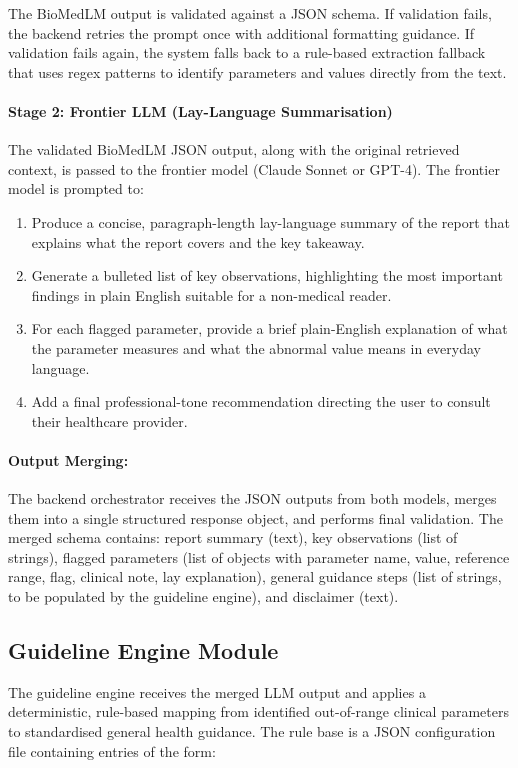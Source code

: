 \documentclass[12pt,a4paper]{report}
\begin{document}
The BioMedLM output is validated against a JSON schema. If validation fails, the backend retries the prompt once with additional formatting guidance. If validation fails again, the system falls back to a rule-based extraction fallback that uses regex patterns to identify parameters and values directly from the text.

\paragraph{Stage 2: Frontier LLM (Lay-Language Summarisation)}
The validated BioMedLM JSON output, along with the original retrieved context, is passed to the frontier model (Claude Sonnet or GPT-4). The frontier model is prompted to:

\begin{enumerate}
    \item Produce a concise, paragraph-length lay-language summary of the report that explains what the report covers and the key takeaway.
    \item Generate a bulleted list of key observations, highlighting the most important findings in plain English suitable for a non-medical reader.
    \item For each flagged parameter, provide a brief plain-English explanation of what the parameter measures and what the abnormal value means in everyday language.
    \item Add a final professional-tone recommendation directing the user to consult their healthcare provider.
\end{enumerate}

\paragraph{Output Merging:}
The backend orchestrator receives the JSON outputs from both models, merges them into a single structured response object, and performs final validation. The merged schema contains: report summary (text), key observations (list of strings), flagged parameters (list of objects with parameter name, value, reference range, flag, clinical note, lay explanation), general guidance steps (list of strings, to be populated by the guideline engine), and disclaimer (text).

\subsection{Guideline Engine Module}
The guideline engine receives the merged LLM output and applies a deterministic, rule-based mapping from identified out-of-range clinical parameters to standardised general health guidance. The rule base is a JSON configuration file containing entries of the form:
\end{document}

